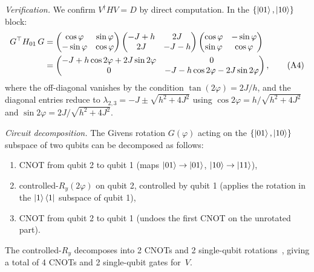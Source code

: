 \emph{Verification.}
We confirm $V^\dagger H V = D$ by direct computation.
In the $\{\ket{01}, \ket{10}\}$ block:
\begin{align}
	G^\top H_{01}\,G & = \begin{pmatrix}
		                     \cos\varphi  & \sin\varphi \\
		                     -\sin\varphi & \cos\varphi
	                     \end{pmatrix}
	\begin{pmatrix}
		-J+h & 2J   \\
		2J   & -J-h
	\end{pmatrix}
	\begin{pmatrix}
		\cos\varphi & -\sin\varphi \\
		\sin\varphi & \cos\varphi
	\end{pmatrix}
	\notag                                                                                         \\
	                 & = \begin{pmatrix}
		                     -J + h\cos2\varphi + 2J\sin2\varphi & 0                                   \\
		                     0                                   & -J - h\cos2\varphi - 2J\sin2\varphi
	                     \end{pmatrix},
	\tag{A4}
\end{align}
where the off-diagonal vanishes by the condition
$\tan(2\varphi) = 2J/h$, and the diagonal entries reduce
to $\lambda_{2,3} = -J \pm \sqrt{h^2+4J^2}$ using
$\cos2\varphi = h/\sqrt{h^2+4J^2}$ and
$\sin2\varphi = 2J/\sqrt{h^2+4J^2}$.

\emph{Circuit decomposition.}
The Givens rotation $G(\varphi)$ acting on the
$\{\ket{01}, \ket{10}\}$ subspace of two qubits can be
decomposed as follows:
\begin{enumerate}
	\item CNOT from qubit 2 to qubit 1 (maps $\ket{01}
		      \to \ket{01}$, $\ket{10} \to \ket{11}$),
	\item controlled-$R_y(2\varphi)$ on qubit 2, controlled
	      by qubit 1 (applies the rotation in the
	      $\ket{1}\bra{1}$ subspace of qubit 1),
	\item CNOT from qubit 2 to qubit 1 (undoes the first
	      CNOT on the unrotated part).
\end{enumerate}
The controlled-$R_y$ decomposes into 2 CNOTs and 2
single-qubit rotations~\cite{NielsenChuang2010}, giving
a total of 4 CNOTs and 2 single-qubit gates for~$V$.

